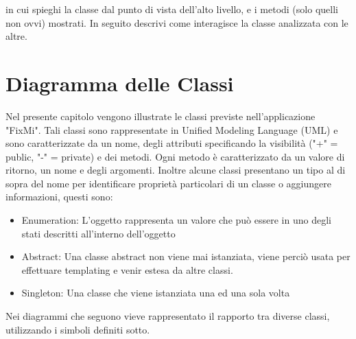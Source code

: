 \documentclass{report}
\begin{document}
in cui spieghi la classe dal punto di vista dell'alto livello, e i metodi (solo quelli non ovvi) mostrati.
In seguito descrivi come interagisce la classe analizzata con le altre.


\fi
	
\chapter{Diagramma delle Classi}

Nel presente capitolo vengono illustrate le classi previste nell'applicazione "FixMi". Tali classi sono rappresentate in Unified Modeling Language (UML) e sono caratterizzate da un nome, degli attributi specificando la visibilità ("+" = public, "-" = private) e dei metodi. Ogni metodo è caratterizzato da un valore di ritorno, un nome e degli argomenti. Inoltre alcune classi presentano un tipo al di sopra del nome per identificare proprietà particolari di un classe o aggiungere informazioni, questi sono:
\begin{itemize}
	\item Enumeration: L'oggetto rappresenta un valore che può essere in uno degli stati descritti all'interno dell'oggetto
	\item Abstract: Una classe abstract non viene mai istanziata, viene perciò usata per effettuare templating e venir estesa da altre classi.
	\item Singleton: Una classe che viene istanziata una ed una sola volta
\end{itemize}
Nei diagrammi che seguono vieve rappresentato il rapporto tra diverse classi, utilizzando i simboli definiti sotto.
\end{document}

